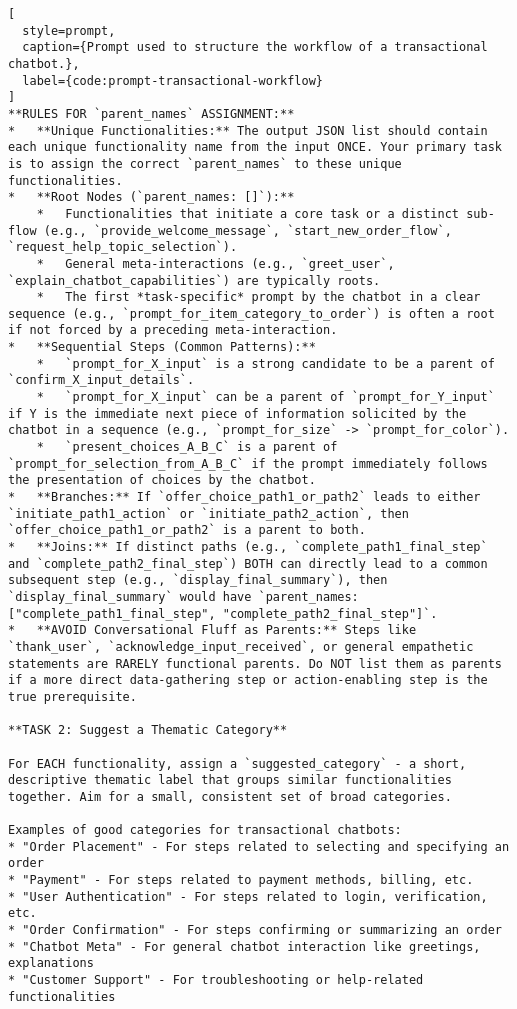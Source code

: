 \begin{lstlisting}[
  style=prompt,
  caption={Prompt used to structure the workflow of a transactional chatbot.},
  label={code:prompt-transactional-workflow}
]
**RULES FOR `parent_names` ASSIGNMENT:**
*   **Unique Functionalities:** The output JSON list should contain each unique functionality name from the input ONCE. Your primary task is to assign the correct `parent_names` to these unique functionalities.
*   **Root Nodes (`parent_names: []`):**
    *   Functionalities that initiate a core task or a distinct sub-flow (e.g., `provide_welcome_message`, `start_new_order_flow`, `request_help_topic_selection`).
    *   General meta-interactions (e.g., `greet_user`, `explain_chatbot_capabilities`) are typically roots.
    *   The first *task-specific* prompt by the chatbot in a clear sequence (e.g., `prompt_for_item_category_to_order`) is often a root if not forced by a preceding meta-interaction.
*   **Sequential Steps (Common Patterns):**
    *   `prompt_for_X_input` is a strong candidate to be a parent of `confirm_X_input_details`.
    *   `prompt_for_X_input` can be a parent of `prompt_for_Y_input` if Y is the immediate next piece of information solicited by the chatbot in a sequence (e.g., `prompt_for_size` -> `prompt_for_color`).
    *   `present_choices_A_B_C` is a parent of `prompt_for_selection_from_A_B_C` if the prompt immediately follows the presentation of choices by the chatbot.
*   **Branches:** If `offer_choice_path1_or_path2` leads to either `initiate_path1_action` or `initiate_path2_action`, then `offer_choice_path1_or_path2` is a parent to both.
*   **Joins:** If distinct paths (e.g., `complete_path1_final_step` and `complete_path2_final_step`) BOTH can directly lead to a common subsequent step (e.g., `display_final_summary`), then `display_final_summary` would have `parent_names: ["complete_path1_final_step", "complete_path2_final_step"]`.
*   **AVOID Conversational Fluff as Parents:** Steps like `thank_user`, `acknowledge_input_received`, or general empathetic statements are RARELY functional parents. Do NOT list them as parents if a more direct data-gathering step or action-enabling step is the true prerequisite.

**TASK 2: Suggest a Thematic Category**

For EACH functionality, assign a `suggested_category` - a short, descriptive thematic label that groups similar functionalities together. Aim for a small, consistent set of broad categories.

Examples of good categories for transactional chatbots:
* "Order Placement" - For steps related to selecting and specifying an order
* "Payment" - For steps related to payment methods, billing, etc.
* "User Authentication" - For steps related to login, verification, etc.
* "Order Confirmation" - For steps confirming or summarizing an order
* "Chatbot Meta" - For general chatbot interaction like greetings, explanations
* "Customer Support" - For troubleshooting or help-related functionalities


\end{lstlisting}
